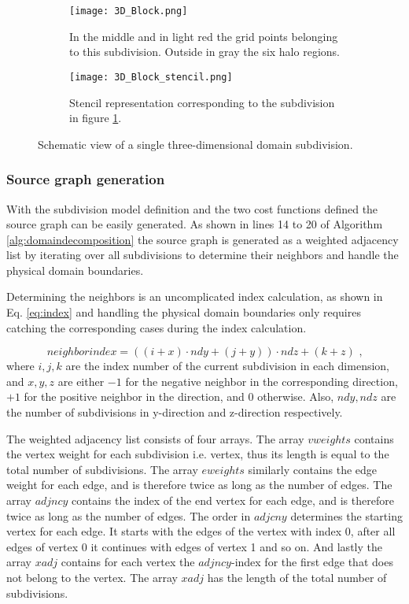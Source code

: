 \begin{figure}[!htbp]
\centering
\begin{subfigure}{0.8\textwidth}
  \centering
  \texttt{[image: 3D\_Block.png]}
  \caption{In the middle and in light red the grid points belonging to this subdivision.
Outside in gray the six halo regions.}
  \label{fig:3DBlock}
\end{subfigure}%
\begin{subfigure}{0.2\textwidth}
  \centering
  \texttt{[image: 3D\_Block\_stencil.png]}
  \caption{Stencil representation corresponding to the subdivision in figure \ref{fig:3DBlock}.}
  \label{fig:3DBlockStencil}
\end{subfigure}
\caption{Schematic view of a single three-dimensional domain subdivision.}
\label{fig:3D_subdivision}
\end{figure}

\subsubsection{Source graph generation}
\label{sec:sourcegraphgeneration}
With the subdivision model definition and the two cost functions defined the source graph can be easily generated.
As shown in lines 14 to 20 of Algorithm \ref{alg:domaindecomposition} the source graph is generated as a weighted adjacency list by iterating over all subdivisions to determine their neighbors and handle the physical domain boundaries.

Determining the neighbors is an uncomplicated index calculation, as shown in Eq. \ref{eq:index} and handling the physical domain boundaries only requires catching the corresponding cases during the index calculation.

\begin{equation}
neighborindex = \left(\left(i + x\right) \cdot ndy + \left(j + y\right)\right) \cdot ndz + \left(k + z\right) \text{ ,}
\label{eq:index}
\end{equation}
where $i, j, k$ are the index number of the current subdivision in each dimension, and $x, y, z$ are either $-1$ for the negative neighbor in the corresponding direction, $+1$ for the positive neighbor in the direction, and $0$ otherwise. 
Also, $ndy, ndz$ are the number of subdivisions in y-direction and z-direction respectively.

The weighted adjacency list consists of four arrays.
The array $vweights$ contains the vertex weight for each subdivision i.e. vertex, thus its length is equal to the total number of subdivisions.
The array $eweights$ similarly contains the edge weight for each edge, and is therefore twice as long as the number of edges.
The array $adjncy$ contains the index of the end vertex for each edge, and is therefore twice as long as the number of edges.
The order in $adjcny$ determines the starting vertex for each edge.
It starts with the edges of the vertex with index 0, after all edges of vertex 0 it continues with edges of vertex 1 and so on.
And lastly the array $xadj$ contains for each vertex the $adjncy$-index for the first edge that does not belong to the vertex.
The array $xadj$ has the length of the total number of subdivisions.

